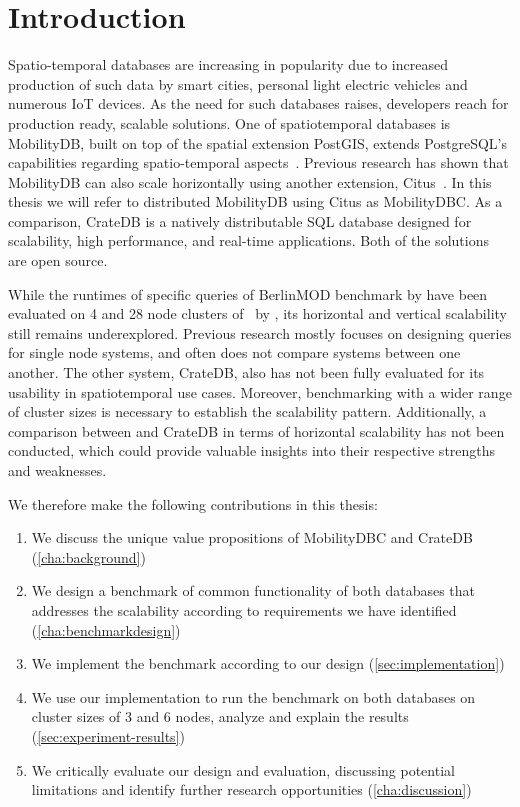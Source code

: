 \section{Introduction}
\label{cha:introduction}

Spatio-temporal databases are increasing in popularity due to increased production of such data by smart cities, personal light electric vehicles and numerous IoT devices.
As the need for such databases raises, developers reach for production ready, scalable solutions.
One of spatiotemporal databases is MobilityDB, built on top of the spatial extension PostGIS, extends PostgreSQL's capabilities regarding spatio-temporal aspects~\parencite{zimanyiMobilityDBMobilityDatabase2020}.
Previous research has shown that MobilityDB can also scale horizontally using another extension, Citus~\parencite{bakliDistributedMobilityData2020, bakliDistributedMovingObject2019, cubukcuCitusDistributedPostgreSQL2021}.
In this thesis we will refer to distributed MobilityDB using Citus as MobilityDBC.
As a comparison, CrateDB is a natively distributable SQL database designed for scalability, high performance, and real-time applications.
Both of the solutions are open source.

While the runtimes of specific queries of BerlinMOD benchmark by \textcite{duntgenBerlinMODBenchmarkMoving2009} have been evaluated on 4 and 28 node clusters of \mobilitydbc~by \parencite{bakliDistributedMobilityData2020}, its horizontal and vertical scalability still remains underexplored.
Previous research mostly focuses on designing queries for single node systems, and often does not compare systems between one another.
The other system, CrateDB, also has not been fully evaluated for its usability in spatiotemporal use cases.
Moreover, benchmarking with a wider range of cluster sizes is necessary to establish the scalability pattern.
Additionally, a comparison between \mobilitydbc and CrateDB in terms of horizontal scalability has not been conducted, which could provide valuable insights into their respective strengths and weaknesses.

We therefore make the following contributions in this thesis:
\begin{enumerate}
  \item We discuss the unique value propositions of MobilityDBC and CrateDB (\cref{cha:background})
  \item We design a benchmark of common functionality of both databases that addresses the scalability according to requirements we have identified (\cref{cha:benchmarkdesign})
  \item We implement the benchmark according to our design (\cref{sec:implementation})
  \item We use our implementation to run the benchmark on both databases on cluster sizes of 3 and 6 nodes, analyze and explain the results (\cref{sec:experiment-results})
  \item We critically evaluate our design and evaluation, discussing potential limitations and identify further research opportunities (\cref{cha:discussion})
\end{enumerate}
